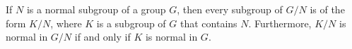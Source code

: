 \begin{theorem}
If $N$ is a normal subgroup of a group $G$, then every subgroup of $G/N$ is of the form $K/N$, where $K$ is a subgroup of $G$ that contains $N$. Furthermore, $K/N$ is normal in $G/N$ if and only if $K$ is normal in $G$.
\end{theorem}
